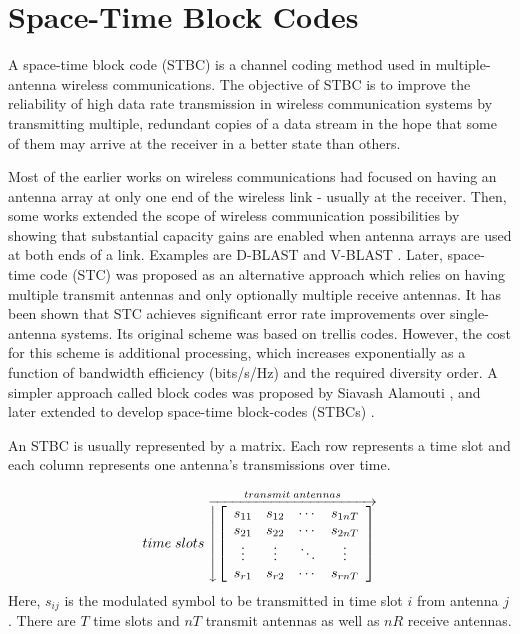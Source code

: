 \section{Space-Time Block Codes}
A space-time block code (STBC) is a channel coding method used in
multiple-antenna wireless communications. The objective of STBC is
to improve the reliability of high data rate transmission in
wireless communication systems by transmitting multiple, redundant
copies of a data stream in the hope that some of them may arrive at
the receiver in a better state than others.

Most of the earlier works on wireless communications had focused on
having an antenna array at only one end of the wireless link -
usually at the receiver. Then, some works extended the scope of
wireless communication possibilities by showing that substantial
capacity gains are enabled when antenna arrays are used at both ends
of a link. Examples are D-BLAST \cite{15} and V-BLAST \cite{16}.
Later, space-time code \cite{5} (STC) was proposed as an alternative
approach which relies on having multiple transmit antennas and only
optionally multiple receive antennas. It has been shown that STC
achieves significant error rate improvements over single-antenna
systems. Its original scheme was based on trellis codes. However,
the cost for this scheme is additional processing, which increases
exponentially as a function of bandwidth efficiency (bits/s/Hz) and
the required diversity order. A simpler approach called block codes
was proposed by Siavash Alamouti \cite{11}, and later extended to
develop space-time block-codes (STBCs) \cite{17}.

An STBC is usually represented by a matrix. Each row represents a
time slot and each column represents one antenna's transmissions
over time.

\[
time\;slots \stackrel{transmit\;antennas} { \overrightarrow{
\left\downarrow \left[
 \begin{array}{cccc}
 s_{11} & s_{12} & \cdots & s_{1nT}\\
 s_{21} & s_{22} & \cdots & s_{2nT}\\
 \vdots & \vdots & \ddots & \vdots \\
 s_{r1} & s_{r2} & \cdots & s_{rnT}\\
 \end{array} \right]
\right. } }
\]
Here, $s_{ij}$ is the modulated symbol to be transmitted in time
slot $i$ from antenna $j$. There are $T$ time slots and $nT$
transmit antennas as well as $nR$ receive antennas.

